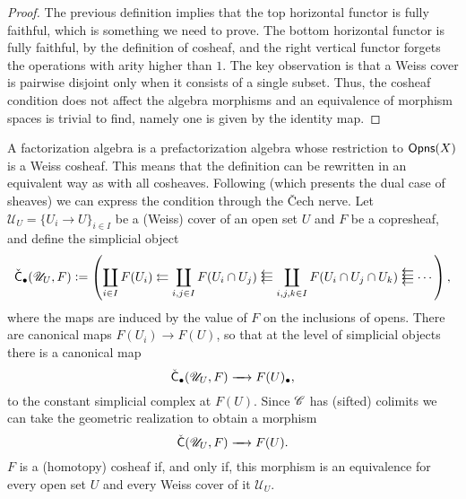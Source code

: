 \documentclass[../text.tex]{subfiles}
\begin{document}
\begin{proof}
    The previous definition implies that the top horizontal functor is fully faithful, which is something we need to prove. The bottom horizontal functor is fully faithful, by the definition of cosheaf, and the right vertical functor forgets the operations with arity higher than $1$. The key observation is that a Weiss cover is pairwise disjoint only when it consists of a single subset. Thus, the cosheaf condition does not affect the algebra morphisms and an equivalence of morphism spaces is trivial to find, namely one is given by the identity map.
\end{proof}

\begin{remark}\label{rem:check_nerve}
    A factorization algebra is a prefactorization algebra whose restriction to $\opens[r](X)$ is a Weiss cosheaf. This means that the definition can be rewritten in an equivalent way as with all cosheaves. Following \cite{nlab} (which presents the dual case of sheaves) we can express the condition through the \v{C}ech nerve. Let $\mathscr{U}_U = \{ U_i \rightarrow U\}_{i \in I}$ be a (Weiss) cover of an open set $U$ and $F$ be a copresheaf, and define the simplicial object
    \begin{equation}
        \check{\mathsf{C}}_{\bullet}(\mathscr{U}_U, F) := \left( \coprod_{i \in I} F(U_i) \leftleftarrows \coprod_{i, j \in I} F(U_i \cap U_j) \mathrel{\substack{\textstyle\leftarrow\\[-0.6ex]
        \textstyle\leftarrow\\[-0.6ex]\textstyle\leftarrow}} \coprod_{i, j, k \in I} F(U_i \cap U_j \cap U_k) \mathrel{\substack{\textstyle\leftarrow\\[-0.6ex]\textstyle\leftarrow\\[-0.6ex]\textstyle\leftarrow\\[-0.6ex]\textstyle\leftarrow}} \cdots  \right),
    \end{equation}
    where the maps are induced by the value of $F$ on the inclusions of opens. There are canonical maps $F(U_i) \rightarrow F(U)$, so that at the level of simplicial objects there is a canonical map
    \begin{equation}
        \check{\mathsf{C}}_{\bullet} (\mathscr{U}_U, F) \xrightarrow{\quad} F(U)_{\bullet},
    \end{equation}
    to the constant simplicial complex at $F(U)$. Since $\mathscr{C}$ has (sifted) colimits we can take the geometric realization to obtain a morphism
    \begin{equation}
        \check{\mathsf{C}}(\mathscr{U}_U, F) \xrightarrow{\quad} F(U).
    \end{equation}
    $F$ is a (homotopy) cosheaf if, and only if, this morphism is an equivalence for every open set $U$ and every Weiss cover of it $\mathscr{U}_U$.
\end{remark}
\end{document}

